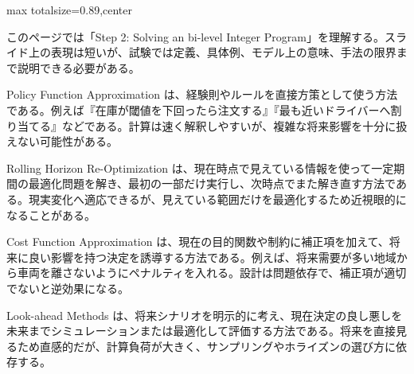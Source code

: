 \begin{minipage}[t]{0.58\textwidth}
\begin{adjustbox}{max totalsize={\textwidth}{0.89\textheight},center}
\begin{minipage}{\textwidth}\scriptsize
{}このページでは「Step 2: Solving an bi-level Integer Program」を理解する。スライド上の表現は短いが、試験では定義、具体例、モデル上の意味、手法の限界まで説明できる必要がある。\par
Policy Function Approximation は、経験則やルールを直接方策として使う方法である。例えば『在庫が閾値を下回ったら注文する』『最も近いドライバーへ割り当てる』などである。計算は速く解釈しやすいが、複雑な将来影響を十分に扱えない可能性がある。\par
Rolling Horizon Re-Optimization は、現在時点で見えている情報を使って一定期間の最適化問題を解き、最初の一部だけ実行し、次時点でまた解き直す方法である。現実変化へ適応できるが、見えている範囲だけを最適化するため近視眼的になることがある。\par
Cost Function Approximation は、現在の目的関数や制約に補正項を加えて、将来に良い影響を持つ決定を誘導する方法である。例えば、将来需要が多い地域から車両を離さないようにペナルティを入れる。設計は問題依存で、補正項が適切でないと逆効果になる。\par
Look-ahead Methods は、将来シナリオを明示的に考え、現在決定の良し悪しを未来までシミュレーションまたは最適化して評価する方法である。将来を直接見るため直感的だが、計算負荷が大きく、サンプリングやホライズンの選び方に依存する。\par

\end{minipage}
\end{adjustbox}
\end{minipage}
